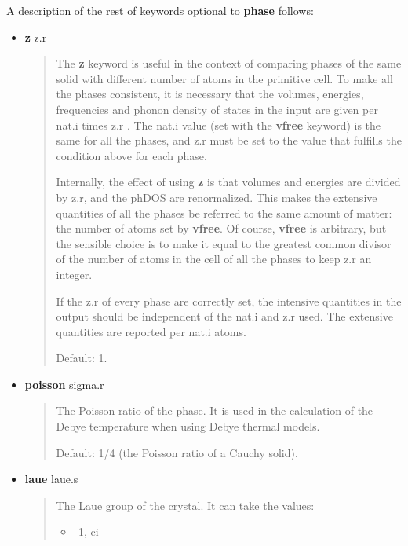 \documentclass[a4paper]{article}
\begin{document}
A description of the rest of keywords optional to \textbf{phase} follows:
%
\begin{itemize}

\item \textbf{z} z.r
%
\begin{quote}

The \textbf{z} keyword is useful in the context of comparing phases of
the same solid with different number of atoms in the primitive
cell. To make all the phases consistent, it is necessary that the
volumes, energies, frequencies and phonon density of states in the
input are given per nat.i times z.r . The nat.i value (set with the
\textbf{vfree} keyword) is the same for all the phases, and z.r must be
set to the value that fulfills the condition above for each phase.

Internally, the effect of using \textbf{z} is that volumes and energies
are divided by z.r, and the phDOS are renormalized. This makes the
extensive quantities of all the phases be referred to the same
amount of matter: the number of atoms set by \textbf{vfree}. Of course,
\textbf{vfree} is arbitrary, but the sensible choice is to make it equal
to the greatest common divisor of the number of atoms in the cell of
all the phases to keep z.r an integer.

If the z.r of every phase are correctly set, the intensive
quantities in the output should be independent of the nat.i and z.r
used. The extensive quantities are reported per nat.i atoms.

Default: 1.

\end{quote}

\item \textbf{poisson} sigma.r
%
\begin{quote}

The Poisson ratio of the phase. It is used in the calculation of the
Debye temperature when using Debye thermal models.

Default: 1/4 (the Poisson ratio of a Cauchy solid).

\end{quote}

\item \textbf{laue} laue.s
%
\begin{quote}

The Laue group of the crystal. It can take the values:
%
\begin{itemize}

\item -1, ci


\end{itemize}
\end{quote}
\end{itemize}
\end{document}
